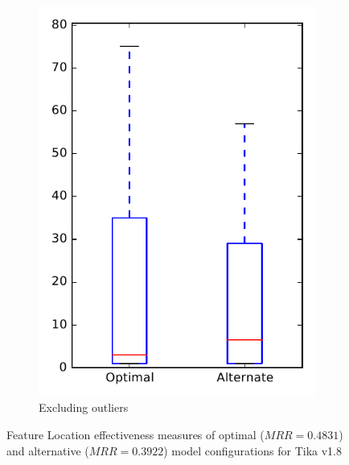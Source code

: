 \begin{figure}
\begin{subfigure}{.4\textwidth}
        \includegraphics[height=0.4\textheight]{figures/combo/flt_rq1_tika_no_outlier}
        \caption{Excluding outliers}\label{fig:combo:flt:rq1:tika_no_outlier}
    \end{subfigure}
\caption[Feature Location effectiveness measures of optimal and alternative model configurations for Tika v1.8]%
{Feature Location effectiveness measures of optimal ($MRR=0.4831$) and alternative ($MRR=0.3922$) model configurations for Tika v1.8}
\label{fig:combo:flt:rq1:tika}
\end{figure}
